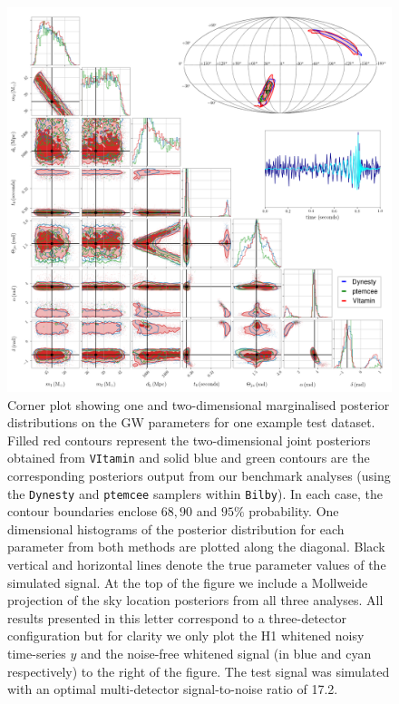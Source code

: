 \documentclass{article}
\begin{document}
%
%
\begin{figure}
    \includegraphics[width=\textwidth]{corner_testcase0.png}
    \caption{\label{fig:corner_plot} Corner plot showing one and two-dimensional
marginalised posterior distributions on the \ac{GW} parameters for one
example test dataset. Filled red contours represent the
two-dimensional joint posteriors obtained from \texttt{VItamin} and
solid blue and green contours are the corresponding posteriors
output from our benchmark analyses (using the \texttt{Dynesty} and \texttt{ptemcee}
samplers within \texttt{Bilby}). In each case, the contour boundaries enclose
$68,90$ and $95\%$ probability. One dimensional histograms of the posterior
distribution for each parameter from both methods are plotted along the
diagonal. Black vertical and horizontal lines denote the true parameter
values of the simulated signal. At the top of the figure we include a Mollweide
projection of the sky location posteriors from all three analyses. All results
presented in this letter correspond to a three-detector configuration but for
clarity we only plot the H1 whitened noisy time-series $y$ and the noise-free
whitened signal (in blue and cyan respectively) to the right of the figure. The
test signal was simulated with an optimal multi-detector signal-to-noise ratio of
17.2.} 
\end{figure}
\end{document}

